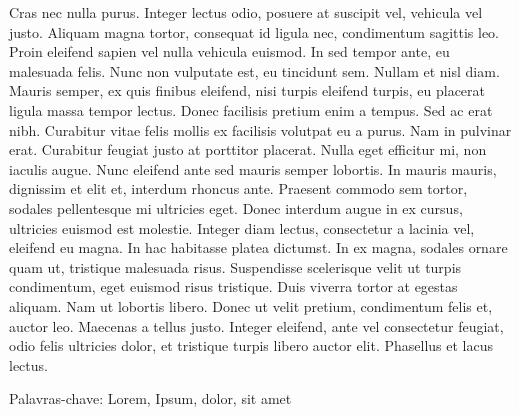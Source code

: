\begin{newpage}
	Cras nec nulla purus. Integer lectus odio, posuere at suscipit vel, vehicula vel justo. Aliquam magna tortor, consequat id ligula nec, condimentum sagittis leo. Proin eleifend sapien vel nulla vehicula euismod. In sed tempor ante, eu malesuada felis. Nunc non vulputate est, eu tincidunt sem. Nullam et nisl diam. Mauris semper, ex quis finibus eleifend, nisi turpis eleifend turpis, eu placerat ligula massa tempor lectus. Donec facilisis pretium enim a tempus. Sed ac erat nibh. Curabitur vitae felis mollis ex facilisis volutpat eu a purus. Nam in pulvinar erat.
	Curabitur feugiat justo at porttitor placerat. Nulla eget efficitur mi, non iaculis augue. Nunc eleifend ante sed mauris semper lobortis. In mauris mauris, dignissim et elit et, interdum rhoncus ante. Praesent commodo sem tortor, sodales pellentesque mi ultricies eget. Donec interdum augue in ex cursus, ultricies euismod est molestie. Integer diam lectus, consectetur a lacinia vel, eleifend eu magna. In hac habitasse platea dictumst. In ex magna, sodales ornare quam ut, tristique malesuada risus. Suspendisse scelerisque velit ut turpis condimentum, eget euismod risus tristique. Duis viverra tortor at egestas aliquam. Nam ut lobortis libero. Donec ut velit pretium, condimentum felis et, auctor leo. Maecenas a tellus justo. Integer eleifend, ante vel consectetur feugiat, odio felis ultricies dolor, et tristique turpis libero auctor elit. Phasellus et lacus lectus. 
	
 	\vspace{1.5\baselineskip} %
	\par %
	\noindent %
	Palavras-chave: Lorem, Ipsum, dolor, sit amet
	\par %
\end{newpage}









